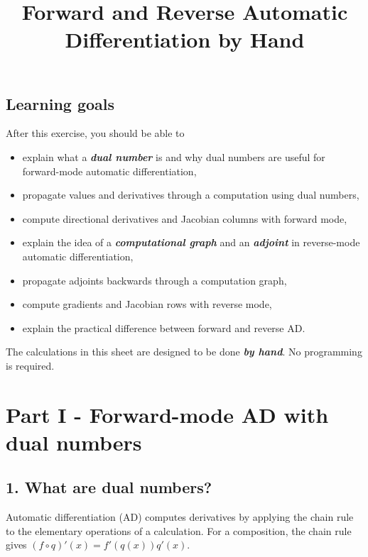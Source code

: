 \documentclass{course_sheet}
\begin{document}
\title{Forward and Reverse Automatic Differentiation by Hand}
\author{}
\date{}
\maketitle
\subsection*{Learning goals}
After this exercise, you should be able to

\begin{itemize}
\item
explain what a \textbf{\textit{dual number}} is and why dual numbers are useful for forward-mode automatic differentiation,

\item
propagate values and derivatives through a computation using dual numbers,

\item
compute directional derivatives and Jacobian columns with forward mode,

\item
explain the idea of a \textbf{\textit{computational graph}} and an \textbf{\textit{adjoint}} in reverse-mode automatic differentiation,

\item
propagate adjoints backwards through a computation graph,

\item
compute gradients and Jacobian rows with reverse mode,

\item
explain the practical difference between forward and reverse AD.

\end{itemize}
The calculations in this sheet are designed to be done \textbf{\textit{by hand}}. No programming is required.

\clearpage
\section*{Part I - Forward-mode AD with dual numbers}
\subsection*{1. What are dual numbers?}
Automatic differentiation (AD) computes derivatives by applying the chain rule to the elementary operations of a calculation. For a composition, the chain rule gives $(f\circ q)'(x)=f'(q(x))q'(x)$.
\end{document}
